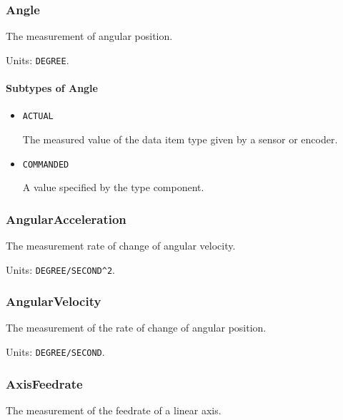 \subsubsection{Angle}
\label{sec:Angle}



The measurement of angular position.


Units: \texttt{DEGREE}.

\paragraph{Subtypes of Angle}\mbox{}
\label{sec:Subtypes of Angle}

\begin{itemize}

\item \texttt{ACTUAL}


The measured value of the data item type given by a sensor or encoder.

\item \texttt{COMMANDED}


A value specified by the  type component.


\end{itemize}

\subsubsection{AngularAcceleration}
\label{sec:AngularAcceleration}



The measurement rate of change of angular velocity.


Units: \texttt{DEGREE/SECOND\^{}2}.

\subsubsection{AngularVelocity}
\label{sec:AngularVelocity}



The measurement of the rate of change of angular position.


Units: \texttt{DEGREE/SECOND}.

\subsubsection{AxisFeedrate}
\label{sec:AxisFeedrate}



The measurement of the feedrate of a linear axis.


